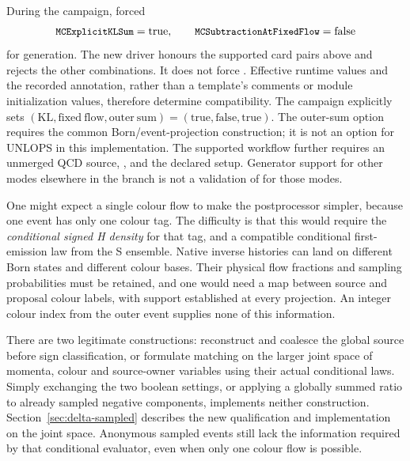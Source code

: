 During the campaign,  forced
\begin{equation}
 \text{\code{\detokenize{MCExplicitKLSum}}}=\mathrm{true},\qquad
 \text{\code{\detokenize{MCSubtractionAtFixedFlow}}}=\mathrm{false}
 \label{eq:source-forcedflags}
\end{equation}
for \macnlops{} generation. The new driver honours the supported card
pairs above and rejects the other combinations. It does not force
. Effective runtime values and the recorded
annotation, rather than a template's comments or module initialization
values, therefore determine compatibility. The campaign explicitly sets
$(\mathrm{KL},\mathrm{fixed\ flow},\mathrm{outer\ sum})=(\mathrm{true},
\mathrm{false},\mathrm{true})$. The outer-sum option requires the common
Born/event-projection construction; it is not an option for UNLOPS in this
implementation. The supported \macnlops{} workflow further requires an
unmerged QCD source, , and the declared
\pythia{} setup. Generator support for other modes elsewhere in the branch
is not a validation of \macnlops{} for those modes.

One might expect a single colour flow to make the postprocessor simpler,
because one event has only one colour tag. The difficulty is that this
would require the \emph{conditional signed H density} for that tag, and a
compatible conditional first-emission law from the S ensemble. Native
inverse histories can land on different Born states and different colour
bases. Their physical flow fractions and sampling probabilities must be
retained, and one would need a map between source and proposal colour
labels, with support established at every projection. An integer colour
index from the outer event supplies none of this information.

There are two legitimate constructions: reconstruct and coalesce the global
source before sign classification, or formulate matching on the larger
joint space of momenta, colour and source-owner variables using their
actual conditional laws. Simply exchanging the two boolean settings, or
applying a globally summed ratio to already sampled negative components,
implements neither construction. Section~\ref{sec:delta-sampled}
describes the new qualification and implementation on the joint space.
Anonymous sampled events still lack the information required by that
conditional evaluator, even when only one colour flow is possible.

